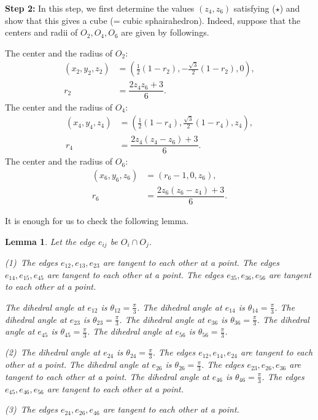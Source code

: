 \documentclass[suppldata, dvipdfmx]{interact}
\theoremstyle{plain}%
\newtheorem{lemma}[theorem]{Lemma}
\theoremstyle{definition}
\theoremstyle{remark}
\theoremstyle{problemstyle}
\begin{document}
{\bfseries Step 2:}
In this step, we first determine the values $(z_4, z_6)$ satisfying ($\star$) and show that this gives a cube (= cubic sphairahedron).  Indeed, suppose that the centers and radii of $O_2, O_4, O_6$ are given by followings.\par
The center and the radius of $O_2$:
\begin{align*}
(x_2, y_2, z_2) &= \left(\frac{1}{2}(1-r_2), -\frac{\sqrt{3}}{2}(1-r_2), 0\right),\\
 r_2 &= \dfrac{2z_4z_6 + 3}{6}.
\end{align*} 
The center and the radius of $O_4$:
\begin{align*}
(x_4, y_4, z_4) &= \left(\frac{1}{2}(1-r_4), \frac{\sqrt{3}}{2}(1-r_4), z_4\right),\\
 r_4 &= \dfrac{2z_4(z_4-z_6) + 3}{6}.
\end{align*} 
The center and the radius of $O_6$:
\begin{align*}
(x_6, y_6, z_6) &= \left(r_6-1, 0, z_6\right),\\
 r_6 &= \dfrac{2z_6(z_6-z_4) + 3}{6}.
\end{align*} 

It is enough for us to check the following lemma.

\begin{lemma}\label{lemma:compatibility}
Let the edge $e_{ij}$ be $O_i\cap O_j$.\par 
(1)\  The edges $e_{12},e_{13},e_{23}$ are tangent to each other at a point.
The edges $e_{14},e_{15},e_{45}$ are tangent to each other at a point.
The edges $e_{35},e_{36},e_{56}$ are tangent to each other at a point.\par
The dihedral angle at $e_{12}$ is $\theta_{12}=\frac{\pi}{3}$.  
The dihedral angle at $e_{14}$ is $\theta_{14}=\frac{\pi}{3}$.
The dihedral angle at $e_{23}$ is $\theta_{23}=\frac{\pi}{3}$.
The dihedral angle at $e_{36}$ is $\theta_{36}=\frac{\pi}{3}$.
The dihedral angle at $e_{45}$ is $\theta_{45}=\frac{\pi}{3}$.
The dihedral angle at $e_{56}$ is $\theta_{56}=\frac{\pi}{3}$.\par
(2)\ The dihedral angle at $e_{24}$ is $\theta_{24}=\frac{\pi}{3}$.  
The edges $e_{12},e_{14},e_{24}$ are tangent to each other at a point.
The dihedral angle at $e_{26}$ is $\theta_{26}=\frac{\pi}{3}$.
The edges $e_{23},e_{26},e_{36}$ are tangent to each other at a point.
The dihedral angle at $e_{46}$ is $\theta_{46}=\frac{\pi}{3}$.
The edges $e_{45},e_{46},e_{56}$ are tangent to each other at a point.\par
(3)\ The edges $e_{24},e_{26},e_{46}$ are tangent to each other at a point.
\end{lemma}
\end{document}
